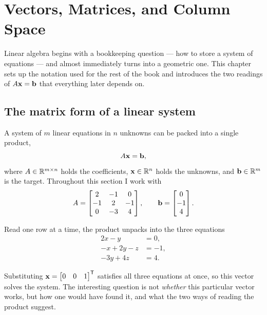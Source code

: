 \setchapterpreamble[u]{\margintoc}
\chapter{Vectors, Matrices, and Column Space}


Linear algebra begins with a bookkeeping question --- how to store a system of
equations --- and almost immediately turns into a geometric one. This chapter
sets up the notation used for the rest of the book and introduces the two
readings of \(A\mathbf{x}=\mathbf{b}\) that everything later depends on.

\section{The matrix form of a linear system}

A system of \(m\) linear equations in \(n\) unknowns can be packed into a single
product,
\[
	A\mathbf{x}=\mathbf{b},
\]
where \(A\in\mathbb{R}^{m\times n}\) holds the coefficients, \(\mathbf{x}\in\mathbb{R}^{n}\) holds
the unknowns, and \(\mathbf{b}\in\mathbb{R}^{m}\) is the target. Throughout this section I
work with
\[
	A=\begin{bmatrix}
		2 & -1 & 0 \\
		-1 & 2 & -1 \\
		0 & -3 & 4
	\end{bmatrix},
	\qquad
	\mathbf{b}=\begin{bmatrix}0\\-1\\4\end{bmatrix}.
\]

Read one row at a time, the product unpacks into the three equations
\begin{align*}
	2x-y    &= 0,\\
	-x+2y-z &= -1,\\
	-3y+4z  &= 4.
\end{align*}


Substituting \(\mathbf{x}=\begin{bmatrix}0&0&1\end{bmatrix}^{\mathsf{T}}\) satisfies all
three equations at once, so this vector solves the system. The interesting
question is not \emph{whether} this particular vector works, but how one would
have found it, and what the two ways of reading the product suggest.


